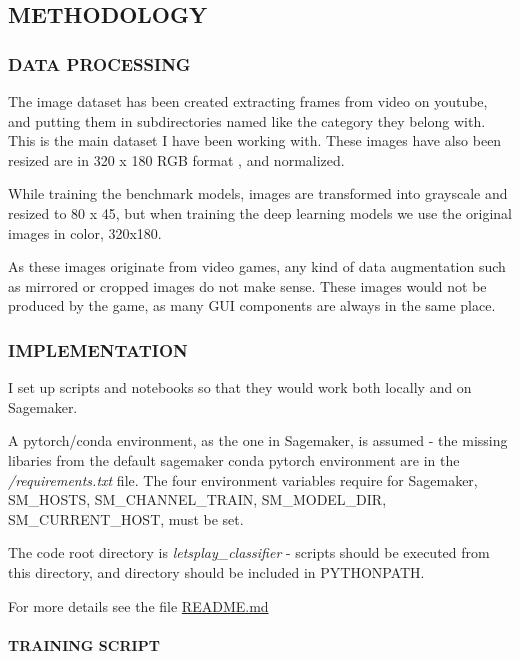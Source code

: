 \documentclass[
]{article}
\begin{document}
\hypertarget{methodology}{%
\subsection{METHODOLOGY}\label{methodology}}

\hypertarget{data-processing}{%
\subsubsection{DATA PROCESSING}\label{data-processing}}

The image dataset has been created extracting frames from video on
youtube, and putting them in subdirectories named like the category they
belong with. This is the main dataset I have been working with. These
images have also been resized are in 320 x 180 RGB format , and
normalized.

While training the benchmark models, images are transformed into
grayscale and resized to 80 x 45, but when training the deep learning
models we use the original images in color, 320x180.

As these images originate from video games, any kind of data
augmentation such as mirrored or cropped images do not make sense. These
images would not be produced by the game, as many GUI components are
always in the same place.

\hypertarget{implementation}{%
\subsubsection{IMPLEMENTATION}\label{implementation}}

I set up scripts and notebooks so that they would work both locally and
on Sagemaker.

A pytorch/conda environment, as the one in Sagemaker, is assumed - the
missing libaries from the default sagemaker conda pytorch environment
are in the \emph{/requirements.txt} file. The four environment variables
require for Sagemaker, SM\_HOSTS, SM\_CHANNEL\_TRAIN, SM\_MODEL\_DIR,
SM\_CURRENT\_HOST, must be set.

The code root directory is \emph{letsplay\_classifier} - scripts should
be executed from this directory, and directory should be included in
PYTHONPATH.

For more details see the file \url{README.md}

\hypertarget{training-script}{%
\paragraph{TRAINING SCRIPT}\label{training-script}}
\end{document}
